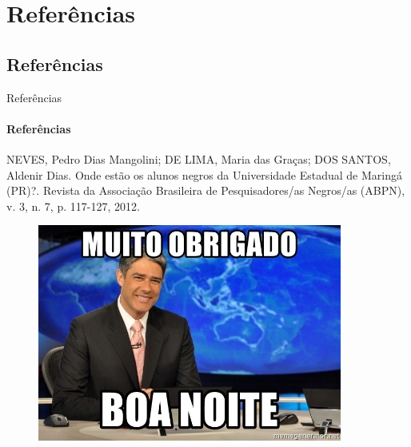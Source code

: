 \documentclass{beamer}
\begin{document}
\section{Referências}
\subsection{Referências}
\begin{frame}{Referências}
\framesubtitle{Referências}
    \justifying
NEVES, Pedro Dias Mangolini; DE LIMA, Maria das Graças; DOS SANTOS, Aldenir Dias. Onde estão os alunos negros da Universidade Estadual de Maringá (PR)?. Revista da Associação Brasileira de Pesquisadores/as Negros/as (ABPN), v. 3, n. 7, p. 117-127, 2012.

\end{frame}
\begin{frame}[plain,c]
   \begin{figure}
       \centering
       \includegraphics[width=10cm]{bonner.jpg}
   \end{figure}
\end{frame}
\end{document}
